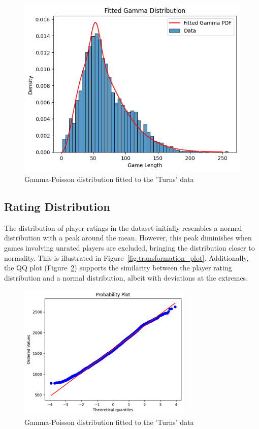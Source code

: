 \documentclass[conference]{IEEEtran}
\begin{document}
\begin{figure}[H]
    \centering
    \includegraphics[width=0.8\linewidth]{gam_poi_fit.png}
    \caption{Gamma-Poisson distribution fitted to the 'Turns' data}
    \label{fig:gam_poi_fit}
\end{figure}


\subsection{Rating Distribution}
The distribution of player ratings in the dataset initially resembles a normal distribution with a peak around the mean. However, this peak diminishes when games involving unrated players are excluded, bringing the distribution closer to normality. This is illustrated in Figure~\ref{fig:transformation_plot}. Additionally, the QQ plot (Figure~\ref{fig:rating_qq}) supports the similarity between the player rating distribution and a normal distribution, albeit with deviations at the extremes.

\begin{figure}[H]
    \centering
    \includegraphics[width=0.8\linewidth]{ratingqq.png}
    \caption{Gamma-Poisson distribution fitted to the 'Turns' data}
    \label{fig:rating_qq}
\end{figure}
\end{document}
